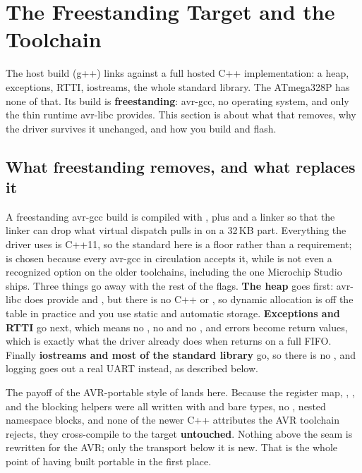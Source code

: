 
\section{The Freestanding Target and the Toolchain}
\label{c9:sec:freestanding}\label{c9:app:b}
The host build (g++) links against a full hosted C++ implementation: a heap, exceptions, RTTI,
iostreams, the whole standard library. The ATmega328P has none of that. Its build is
\textbf{freestanding}: avr-gcc, no operating system, and only the thin runtime avr-libc provides.
This section is about what that removes, why the driver survives it unchanged, and how you build and
flash.

\subsection{What freestanding removes, and what replaces it}
\label{c9:sec:removes}
A freestanding avr-gcc build is compiled with
,
plus  and a linker  so that the
linker can drop what virtual dispatch pulls in on a 32\,KB part. Everything the driver uses is C++11,
so the standard here is a floor rather than a requirement;  is chosen because every
avr-gcc in circulation accepts it, while  is not even a recognized option on the
older toolchains, including the one Microchip Studio ships. Three things go away with the rest of
the flags. \textbf{The heap} goes first: avr-libc does provide  and , but
there is no C++  or , so dynamic allocation is off the
table in practice and you use static and automatic storage. \textbf{Exceptions and RTTI} go next,
which means no , no  and no , and errors become return
values, which is exactly what the driver already does when  returns  on a
full FIFO. Finally \textbf{iostreams and most of the standard library} go, so there is no
, and logging goes out a real UART instead, as described below.

The payoff of the AVR-portable style of  lands here. Because the register map,
, ,  and the blocking helpers were all written with
 and bare types, no , nested namespace blocks, and none of the newer C++
attributes the AVR toolchain rejects, they cross-compile to the target \textbf{untouched}. Nothing
above the seam is rewritten for the AVR; only the transport below it is new. That is the whole point
of having built portable in the first place.

